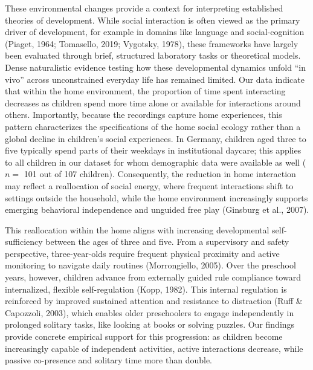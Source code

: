 \documentclass[
  english,
  12pt,
  man,floatsintext]{apa6}
\begin{document}
These environmental changes provide a context for interpreting established theories of development. While social interaction is often viewed as the primary driver of development, for example in domains like language and social-cognition (Piaget, 1964; Tomasello, 2019; Vygotsky, 1978), these frameworks have largely been evaluated through brief, structured laboratory tasks or theoretical models. Dense naturalistic evidence testing how these developmental dynamics unfold ``in vivo'' across unconstrained everyday life has remained limited. Our data indicate that within the home environment, the proportion of time spent interacting decreases as children spend more time alone or available for interactions around others. Importantly, because the recordings capture home experiences, this pattern characterizes the specifications of the home social ecology rather than a global decline in children's social experiences. In Germany, children aged three to five typically spend parts of their weekdays in institutional daycare; this applies to all children in our dataset for whom demographic data were available as well (\(n=\) 101 out of 107 children). Consequently, the reduction in home interaction may reflect a reallocation of social energy, where frequent interactions shift to settings outside the household, while the home environment increasingly supports emerging behavioral independence and unguided free play (Ginsburg et al., 2007).

This reallocation within the home aligns with increasing developmental self-sufficiency between the ages of three and five. From a supervisory and safety perspective, three-year-olds require frequent physical proximity and active monitoring to navigate daily routines (Morrongiello, 2005). Over the preschool years, however, children advance from externally guided rule compliance toward internalized, flexible self-regulation (Kopp, 1982). This internal regulation is reinforced by improved sustained attention and resistance to distraction (Ruff \& Capozzoli, 2003), which enables older preschoolers to engage independently in prolonged solitary tasks, like looking at books or solving puzzles. Our findings provide concrete empirical support for this progression: as children become increasingly capable of independent activities, active interactions decrease, while passive co-presence and solitary time more than double.
\end{document}
